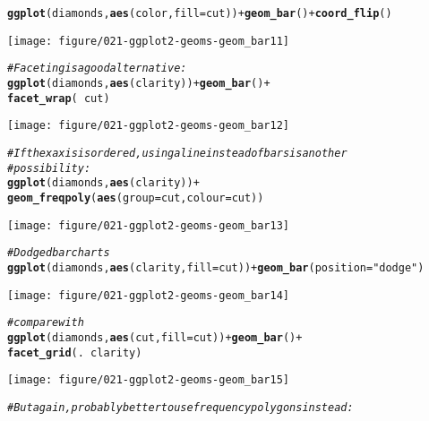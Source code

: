 \documentclass[a4paper,titlepage]{tufte-handout}\usepackage[]{graphicx}\usepackage[]{color}
\makeatletter
\def\maxwidth{ %
  \ifdim\Gin@nat@width>\linewidth
    \linewidth
  \else
    \Gin@nat@width
  \fi
}
\newcommand{\hlstr}[1]{\textcolor[rgb]{0.192,0.494,0.8}{#1}}%
\newcommand{\hlcom}[1]{\textcolor[rgb]{0.678,0.584,0.686}{\textit{#1}}}%
\newcommand{\hlopt}[1]{\textcolor[rgb]{0,0,0}{#1}}%
\newcommand{\hlstd}[1]{\textcolor[rgb]{0.345,0.345,0.345}{#1}}%
\newcommand{\hlkwc}[1]{\textcolor[rgb]{0.333,0.667,0.333}{#1}}%
\newcommand{\hlkwd}[1]{\textcolor[rgb]{0.737,0.353,0.396}{\textbf{#1}}}%
\newenvironment{kframe}{%
 \def\at@end@of@kframe{}%
 \ifinner\ifhmode%
  \def\at@end@of@kframe{\end{minipage}}%
  \begin{minipage}{\columnwidth}%
 \fi\fi%
 \def\FrameCommand##1{\hskip\@totalleftmargin \hskip-\fboxsep
 \colorbox{shadecolor}{##1}\hskip-\fboxsep
     \hskip-\linewidth \hskip-\@totalleftmargin \hskip\columnwidth}%
 \MakeFramed {\advance\hsize-\width
   \@totalleftmargin\z@ \linewidth\hsize
   \@setminipage}}%
 {\par\unskip\endMakeFramed%
 \at@end@of@kframe}
\newenvironment{knitrout}{}{} %
\makeatother
\begin{document}
\begin{knitrout}
\begin{kframe}\begin{alltt}
\hlkwd{ggplot}\hlstd{(diamonds,} \hlkwd{aes}\hlstd{(color,} \hlkwc{fill}\hlstd{=cut))} \hlopt{+} \hlkwd{geom_bar}\hlstd{()} \hlopt{+} \hlkwd{coord_flip}\hlstd{()}
\end{alltt}
\end{kframe}
\texttt{[image: figure/021-ggplot2-geoms-geom\_bar11]} 
\begin{kframe}\begin{alltt}
\hlcom{# Faceting is a good alternative:}
\hlkwd{ggplot}\hlstd{(diamonds,} \hlkwd{aes}\hlstd{(clarity))} \hlopt{+} \hlkwd{geom_bar}\hlstd{()} \hlopt{+}
  \hlkwd{facet_wrap}\hlstd{(}\hlopt{~} \hlstd{cut)}
\end{alltt}
\end{kframe}
\texttt{[image: figure/021-ggplot2-geoms-geom\_bar12]} 
\begin{kframe}\begin{alltt}
\hlcom{# If the x axis is ordered, using a line instead of bars is another}
\hlcom{# possibility:}
\hlkwd{ggplot}\hlstd{(diamonds,} \hlkwd{aes}\hlstd{(clarity))} \hlopt{+}
  \hlkwd{geom_freqpoly}\hlstd{(}\hlkwd{aes}\hlstd{(}\hlkwc{group} \hlstd{= cut,} \hlkwc{colour} \hlstd{= cut))}
\end{alltt}
\end{kframe}
\texttt{[image: figure/021-ggplot2-geoms-geom\_bar13]} 
\begin{kframe}\begin{alltt}
\hlcom{# Dodged bar charts}
\hlkwd{ggplot}\hlstd{(diamonds,} \hlkwd{aes}\hlstd{(clarity,} \hlkwc{fill}\hlstd{=cut))} \hlopt{+} \hlkwd{geom_bar}\hlstd{(}\hlkwc{position}\hlstd{=}\hlstr{"dodge"}\hlstd{)}
\end{alltt}
\end{kframe}
\texttt{[image: figure/021-ggplot2-geoms-geom\_bar14]} 
\begin{kframe}\begin{alltt}
\hlcom{# compare with}
\hlkwd{ggplot}\hlstd{(diamonds,} \hlkwd{aes}\hlstd{(cut,} \hlkwc{fill}\hlstd{=cut))} \hlopt{+} \hlkwd{geom_bar}\hlstd{()} \hlopt{+}
  \hlkwd{facet_grid}\hlstd{(.} \hlopt{~} \hlstd{clarity)}
\end{alltt}
\end{kframe}
\texttt{[image: figure/021-ggplot2-geoms-geom\_bar15]} 
\begin{kframe}\begin{alltt}
\hlcom{# But again, probably better to use frequency polygons instead:}

\end{alltt}
\end{kframe}
\end{knitrout}
\end{document}
